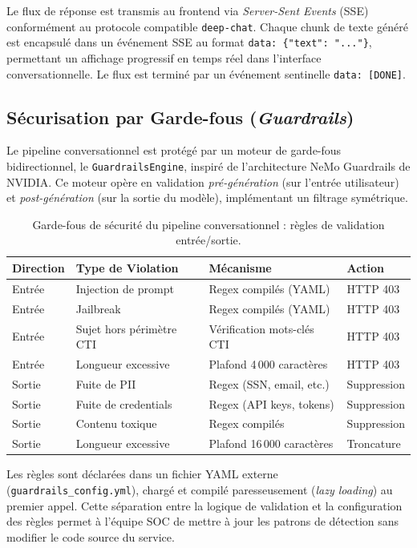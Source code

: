 Le flux de réponse est transmis au frontend via \textit{Server-Sent Events} (SSE) conformément au protocole compatible \texttt{deep-chat}. Chaque chunk de texte généré est encapsulé dans un événement SSE au format \texttt{data: \{"text": "..."\}}, permettant un affichage progressif en temps réel dans l'interface conversationnelle. Le flux est terminé par un événement sentinelle \texttt{data: [DONE]}.

\subsection{Sécurisation par Garde-fous (\textit{Guardrails})}

Le pipeline conversationnel est protégé par un moteur de garde-fous bidirectionnel, le \texttt{GuardrailsEngine}, inspiré de l'architecture NeMo Guardrails de NVIDIA. Ce moteur opère en validation \textit{pré-génération} (sur l'entrée utilisateur) et \textit{post-génération} (sur la sortie du modèle), implémentant un filtrage symétrique.

\begin{table}[H]
\centering
\caption{Garde-fous de sécurité du pipeline conversationnel : règles de validation entrée/sortie.}
\label{tab:guardrails}
\begin{tabular}{|l|l|l|l|}
\hline
\textbf{Direction} & \textbf{Type de Violation} & \textbf{Mécanisme} & \textbf{Action} \\
\hline
Entrée & Injection de prompt & Regex compilés (YAML) & HTTP 403 \\
\hline
Entrée & Jailbreak & Regex compilés (YAML) & HTTP 403 \\
\hline
Entrée & Sujet hors périmètre CTI & Vérification mots-clés CTI & HTTP 403 \\
\hline
Entrée & Longueur excessive & Plafond 4\,000 caractères & HTTP 403 \\
\hline
Sortie & Fuite de PII & Regex (SSN, email, etc.) & Suppression \\
\hline
Sortie & Fuite de credentials & Regex (API keys, tokens) & Suppression \\
\hline
Sortie & Contenu toxique & Regex compilés & Suppression \\
\hline
Sortie & Longueur excessive & Plafond 16\,000 caractères & Troncature \\
\hline
\end{tabular}
\end{table}

Les règles sont déclarées dans un fichier YAML externe (\texttt{guardrails\_config.yml}), chargé et compilé paresseusement (\textit{lazy loading}) au premier appel. Cette séparation entre la logique de validation et la configuration des règles permet à l'équipe SOC de mettre à jour les patrons de détection sans modifier le code source du service.


